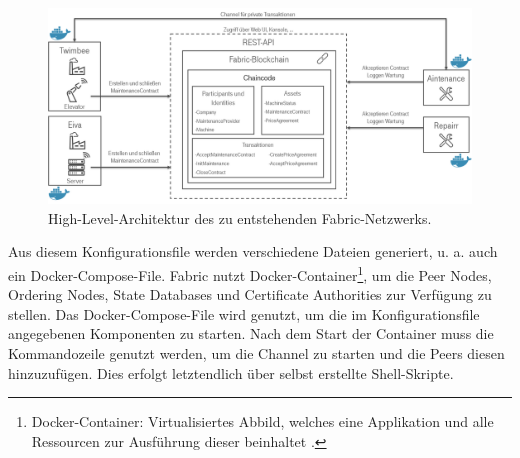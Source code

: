 \begin{figure}[!htbp]
    \centering
      \includegraphics[width=1.0\textwidth,angle=0]{images/architecture_highlevel}
       \caption{High-Level-Architektur des zu entstehenden Fabric-Netzwerks.}
      \label{fig:architecture-high}
\end{figure}



Aus diesem Konfigurationsfile werden verschiedene Dateien generiert, u. a. auch ein Docker-Compose-File. Fabric nutzt Docker-Container\footnote{Docker-Container: Virtualisiertes Abbild, welches eine Applikation und alle Ressourcen zur Ausführung dieser beinhaltet \cite{DockerTeamWhatcontainer2017}.}, um die Peer Nodes, Ordering Nodes, State Databases und Certificate Authorities zur Verfügung zu stellen. Das Docker-Compose-File wird genutzt, um die im Konfigurationsfile angegebenen Komponenten zu starten. Nach dem Start der Container muss die Kommandozeile genutzt werden, um die Channel zu starten und die Peers diesen hinzuzufügen. Dies erfolgt letztendlich über selbst erstellte Shell-Skripte. 


